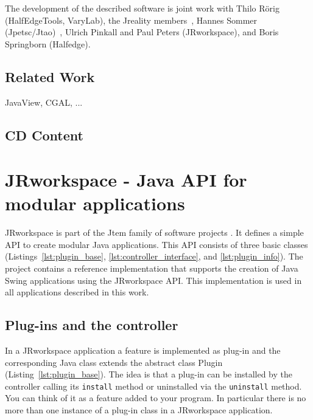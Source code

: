 \documentclass[Thesis.tex]{subfiles}
\begin{document}
The development of the described software is joint work with Thilo R{\" o}rig 
({\sc HalfEdgeTools, VaryLab}), the {\sc Jreality} members~\cite{JrealityWebsite}, Hannes 
Sommer ({\sc Jpetsc/Jtao})~\cite{jpetsctao-web-page}, Ulrich Pinkall and Paul Peters 
({\sc JRworkspace}), and Boris Springborn ({\sc Halfedge}).


\section{Related Work}
\label{sec:related_work}
JavaView, CGAL, ...

\section{CD Content}




\chapter{{\sc JRworkspace} - Java API for modular applications}
\label{chp:jrworkspace}


{\sc JRworkspace} is part of the {\sc Jtem} family of software projects 
\cite{JtemWebsite}. It defines a simple API to create modular Java applications. This API consists of
three basic classes (Listings~\ref{lst:plugin_base}, \ref{lst:controller_interface}, and 
\ref{lst:plugin_info}).
The project contains a reference implementation that supports the creation of Java
Swing applications using the {\sc JRworkspace} API. This implementation is used in all 
applications described in this work.

\section{Plug-ins and the controller}
\label{sec:plugins}

In a {\sc JRworkspace} application a feature is implemented as plug-in and the corresponding Java class 
extends the abstract class Plugin
(Listing~\ref{lst:plugin_base}). The idea is that a plug-in can be installed by the controller 
calling its {\tt install} method or uninstalled via the {\tt uninstall} method. You can think of it 
as a feature added to your program. In particular there is no more than one instance of a
plug-in class in a {\sc JRworkspace} application.
\end{document}
